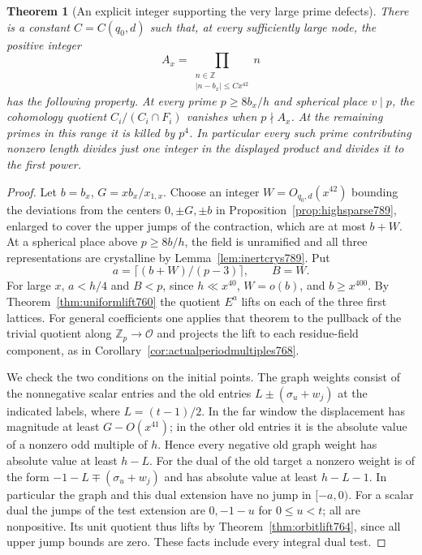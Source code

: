 \documentclass[a4paper,11pt]{article}
\newtheorem{theorem}[proposition]{Theorem}
\theoremstyle{definition}
\theoremstyle{remark}
\newcommand{\ZZ}{\mathbb Z}\newcommand{\ord}{\operatorname{ord}}
\numberwithin{equation}{section}
\begin{document}
\begin{theorem}[An explicit integer supporting the very large prime defects]
\leavevmode\label{thm:highproduct792}
There is a constant \(C=C(q_0,d)\) such that, at every sufficiently
large node, the positive integer
\[
     A_x=\prod_{\substack{n\in\ZZ\\|n-b_x|\le Cx^{42}}}n
\]
has the following property. At every prime \(p\ge 8b_x/h\)
and spherical place \(v\mid p\), the cohomology quotient
\(C_i/(C_i\cap F_i)\) vanishes when \(p\nmid A_x\).
At the remaining primes in this range it is killed by \(p^4\).
In particular every such prime contributing nonzero length
divides just one integer in the displayed product and divides
it to the first power.
\end{theorem}
\begin{proof}
Let \(b=b_x\), \(G=xb_x/x_{1,x}\). Choose an integer
\(W=O_{q_0,d}(x^{42})\) bounding the deviations from the
centers \(0,\pm G,\pm b\) in
Proposition~\ref{prop:highsparse789}, enlarged to cover
the upper jumps of the contraction, which are at most
\(b+W\). At a spherical place above \(p\ge 8b/h\), the
field is unramified and all three representations are
crystalline by Lemma~\ref{lem:inertcrys789}. Put
\[
             a=\lceil(b+W)/(p-3)\rceil,\qquad B=W .
\]
For large \(x\), \(a<h/4\) and \(B<p\), since \(h\ll x^{40}\),
\(W=o(b)\), and \(b\ge x^{400}\). By
Theorem~\ref{thm:uniformlift760} the quotient \(E^a\) lifts
on each of the three first lattices. For general coefficients
one applies that theorem to the pullback of the trivial
quotient along \(\ZZ_p\to\mathcal O\) and projects the lift
to each residue-field component, as in
Corollary~\ref{cor:actualperiodmultiples768}.

We check the two conditions on the initial points. The
graph weights consist of the nonnegative scalar entries and
the old entries \(L\pm(\sigma_u+w_j)\) at the indicated
labels, where \(L=(t-1)/2\). In the far window the
displacement has magnitude at least \(G-O(x^{41})\);
in the other old entries it is the absolute value of a
nonzero odd multiple of \(h\). Hence every negative old
graph weight has absolute value at least \(h-L\). For the
dual of the old target a nonzero weight is of the form
\(-1-L\mp(\sigma_u+w_j)\) and has absolute value at least
\(h-L-1\). In particular the graph and this dual extension
have no jump in \([-a,0)\). For a scalar dual the jumps of
the test extension are \(0,-1-u\) for \(0\le u<t\); all
are nonpositive. Its unit quotient thus lifts by
Theorem~\ref{thm:orbitlift764}, since all upper jump bounds
are zero. These facts include every integral dual test.


\end{proof}
\end{document}
